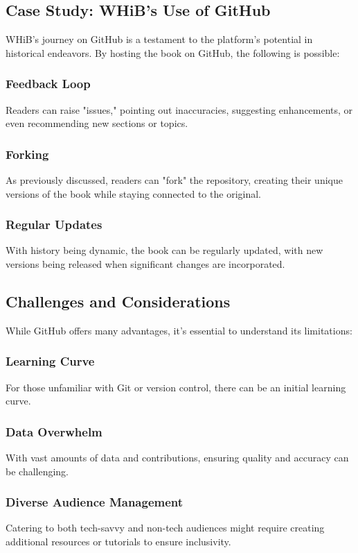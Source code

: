 \documentclass{book}
\begin{document}
\subsection*{Case Study: WHiB's Use of GitHub}
WHiB's journey on GitHub is a testament to the platform's potential in historical endeavors. By hosting the book on GitHub, the following is possible:

\subsubsection*{Feedback Loop}
Readers can raise "issues," pointing out inaccuracies, suggesting enhancements, or even recommending new sections or topics.

\subsubsection*{Forking}
As previously discussed, readers can "fork" the repository, creating their unique versions of the book while staying connected to the original.

\subsubsection*{Regular Updates}
With history being dynamic, the book can be regularly updated, with new versions being released when significant changes are incorporated.

\subsection*{Challenges and Considerations}
While GitHub offers many advantages, it's essential to understand its limitations:

\subsubsection*{Learning Curve}
For those unfamiliar with Git or version control, there can be an initial learning curve.

\subsubsection*{Data Overwhelm}
With vast amounts of data and contributions, ensuring quality and accuracy can be challenging.

\subsubsection*{Diverse Audience Management}
Catering to both tech-savvy and non-tech audiences might require creating additional resources or tutorials to ensure inclusivity.
\end{document}
